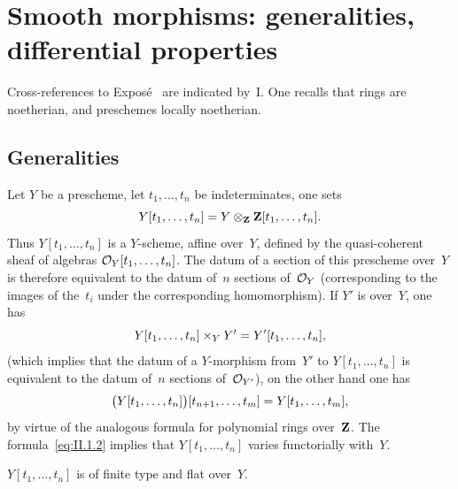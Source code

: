 \chapter{Smooth morphisms: generalities, differential properties}
\label{II}

Cross-references to Expos\'e~ are indicated by~I. One
recalls that rings are noetherian, and preschemes locally noetherian.

\section{Generalities}
\label{II.1}

Let $Y$ be a prescheme, let $t_1,\dots,t_n$ be
indeterminates, one sets
\begin{equation}
\label{eq:II.1.1}
Y[t_1,\dots,t_n]=Y\otimes_\ZZ \ZZ[t_1,\dots,t_n]\quoi.
\end{equation}
Thus $Y[t_1,\dots,t_n]$ is a $Y$-scheme, affine over~$Y$,
defined by the quasi-coherent sheaf of algebras
$\cal{O}_Y[t_1,\dots,t_n]$. The datum of a section of this
prescheme over~$Y$ is therefore equivalent to the
datum of~$n$ sections of~$\cal{O}_Y$ (corresponding to the images
of the~$t_i$ under the corresponding homomorphism). If $Y'$ is
over~$Y$, one has
\begin{equation}
\label{eq:II.1.2}
Y[t_1,\dots,t_n]\times_Y Y'=Y'[t_1,\dots,t_n]\quoi,
\end{equation}
(which implies that the datum of a $Y$-morphism from~$Y'$
to $Y[t_1,\dots,t_n]$ is equivalent to the datum of~$n$
sections of~$\cal{O}_{Y'}$), on the other hand one has
\begin{equation}
\label{eq:II.1.3}
\big(Y[t_1,\dots,t_n]\big)[t_{n+1},\dots,t_m]=Y[t_1,\dots,t_m]\quoi,
\end{equation}
by virtue of the analogous formula for polynomial rings
over~$\ZZ$. The formula~\eqref{eq:II.1.2} implies that
$Y[t_1,\dots,t_n]$ varies functorially with~$Y$.

$Y[t_1,\dots,t_n]$ is of finite type and flat over~$Y$.

